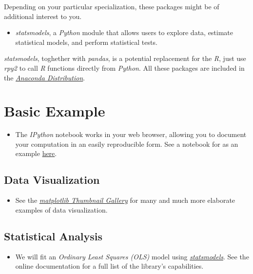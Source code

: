 \documentclass[a4paper,12pt,bold,leqno,fleqn,]{scrartcl}
\begin{document}
Depending on your particular specialization, these packages might be of additional interest to you.

\begin{itemize}
\item \textit{statsmodels}, a \textit{Python} module that allows users to explore data, estimate statistical models, and perform statistical tests. 
\end{itemize}

\textit{statsmodels}, toghether with \textit{pandas}, is a potential replacement for the \textit{R}, just use \textit{rpy2} to call \textit{R} functions directly from \textit{Python}. All these packages are included in the \href{https://www.continuum.io/why-anaconda}{\textit{Anaconda Distribution}}.
\section{Basic Example}
\begin{itemize}
\item The \textit{IPython} notebook works in your web browser, allowing you to document your computation in an easily reproducible form. See a notebook for 
\citet{Reinhart.2010} as an example \href{http://nbviewer.jupyter.org/github/vincentarelbundock/Reinhart-Rogoff/blob/master/reinhart-rogoff.ipynb}{here}.
\end{itemize}
\subsection{Data Visualization }
\begin{itemize}
\item See the \href{http://matplotlib.org/gallery.html}{\textit{matplotlib Thumbnail Gallery}} for many and much more elaborate examples of data visualization.
\end{itemize}
\subsection{Statistical Analysis}
\begin{itemize}
\item We will fit an \textit{Ordinary Least Squares (OLS)} model using \href{http://statsmodels.sourceforge.net}{\textit{statsmodels}}. See the online documentation for a full list of the library's capabilities.
\end{itemize}
\end{document}
